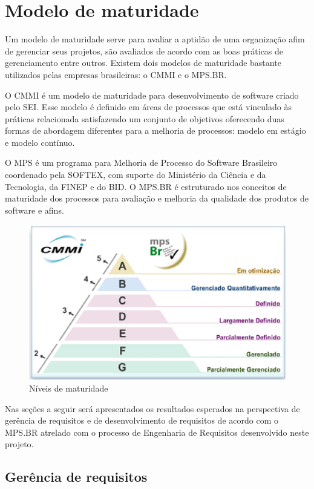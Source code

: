 \chapter{Modelo de maturidade}


	Um modelo de maturidade serve para avaliar a aptidão de uma organização afim de gerenciar seus projetos, são avaliados de acordo com as boas práticas de gerenciamento entre outros. Existem dois modelos de maturidade bastante utilizados pelas empresas brasileiras: o CMMI e o MPS.BR.

	O CMMI é um modelo de maturidade para desenvolvimento de software criado pelo SEI. Esse modelo é definido em áreas de processos que está vinculado às práticas relacionada satisfazendo um conjunto de objetivos oferecendo duas formas de abordagem diferentes para a melhoria de processos: modelo em estágio e modelo contínuo.
	
	O MPS é um programa para Melhoria de Processo do Software Brasileiro coordenado pela SOFTEX, com suporte do Ministério da Ciência e da Tecnologia, da FINEP e do BID. O MPS.BR é estruturado nos conceitos de maturidade dos processos para avaliação e melhoria da qualidade dos produtos de software e afins.

	\begin{figure}[!htpb]
			\centering
			\includegraphics[scale=0.5]{figuras/maturidade/cmmi_mps}
			\caption{Níveis de maturidade}
	\end{figure}

	Nas seções a seguir será apresentados os resultados esperados na perspectiva de gerência de requisitos e de desenvolvimento de requisitos de acordo com o MPS.BR atrelado com o processo de Engenharia de Requisitos desenvolvido neste projeto.

	\section{Gerência de requisitos}

